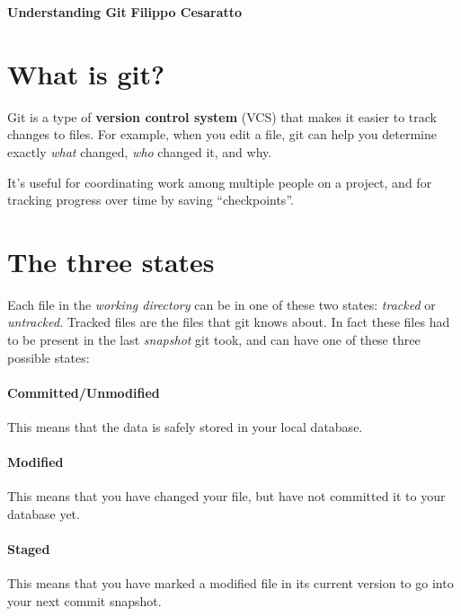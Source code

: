 \documentclass[a4paper, 12pt]{article}
\begin{document}
\noindent
\large\textbf{Understanding Git} \hfill \textbf{Filippo Cesaratto} \\
\normalsize

\section*{What is git?}
Git is a type of \textbf{version control system} (VCS) that makes it easier to track changes to files. For example, when you edit a file, git can help you determine exactly \emph{what} changed, \emph{who} changed it, and why.

It's useful for coordinating work among multiple people on a project, and for tracking progress over time by saving ``checkpoints''. 

\section*{The three states}
Each file in the \emph{working directory} can be in one of these two states: \emph{tracked} or \emph{untracked}. Tracked files are the files that git knows about. In fact these files had to be present in the last \emph{snapshot} git took, and can have one of these three possible states:
\paragraph{Committed/Unmodified} This means that the data is safely stored in your local database.
\paragraph{Modified} This means that you have changed your file, but have not committed it to your database yet.
\paragraph{Staged} This means that you have marked a modified file in its current version to go into your next commit snapshot.
\end{document}
